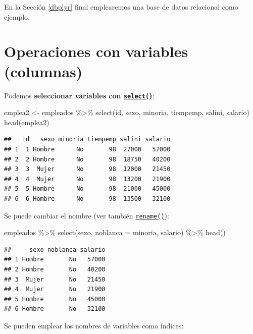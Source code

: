 \documentclass[
]{book}
\newenvironment{Shaded}{\begin{snugshade}}{\end{snugshade}}
\newcommand{\AttributeTok}[1]{\textcolor[rgb]{0.77,0.63,0.00}{#1}}
\newcommand{\FunctionTok}[1]{\textcolor[rgb]{0.00,0.00,0.00}{#1}}
\newcommand{\NormalTok}[1]{#1}
\newcommand{\OtherTok}[1]{\textcolor[rgb]{0.56,0.35,0.01}{#1}}
\newcommand{\SpecialCharTok}[1]{\textcolor[rgb]{0.00,0.00,0.00}{#1}}
\theoremstyle{break}
\theoremstyle{nonumberplain}
\begin{document}
En la Sección \ref{dbplyr} final emplearemos una base de datos relacional como ejemplo.

\hypertarget{dplyr-variables}{%
\section{Operaciones con variables (columnas)}\label{dplyr-variables}}

Podemos \textbf{seleccionar variables con \href{https://dplyr.tidyverse.org/reference/select.html}{\texttt{select()}}}:

\begin{Shaded}
\begin{Highlighting}[]
\NormalTok{emplea2 }\OtherTok{\textless{}{-}}\NormalTok{ empleados }\SpecialCharTok{\%\textgreater{}\%} \FunctionTok{select}\NormalTok{(id, sexo, minoria, tiempemp, salini, salario)}
\FunctionTok{head}\NormalTok{(emplea2)}
\end{Highlighting}
\end{Shaded}

\begin{verbatim}
##   id   sexo minoria tiempemp salini salario
## 1  1 Hombre      No       98  27000   57000
## 2  2 Hombre      No       98  18750   40200
## 3  3  Mujer      No       98  12000   21450
## 4  4  Mujer      No       98  13200   21900
## 5  5 Hombre      No       98  21000   45000
## 6  6 Hombre      No       98  13500   32100
\end{verbatim}

Se puede cambiar el nombre (ver también \href{https://dplyr.tidyverse.org/reference/rename.html}{\texttt{rename()}}):

\begin{Shaded}
\begin{Highlighting}[]
\NormalTok{empleados }\SpecialCharTok{\%\textgreater{}\%} \FunctionTok{select}\NormalTok{(sexo, }\AttributeTok{noblanca =}\NormalTok{ minoria, salario) }\SpecialCharTok{\%\textgreater{}\%} \FunctionTok{head}\NormalTok{()}
\end{Highlighting}
\end{Shaded}

\begin{verbatim}
##     sexo noblanca salario
## 1 Hombre       No   57000
## 2 Hombre       No   40200
## 3  Mujer       No   21450
## 4  Mujer       No   21900
## 5 Hombre       No   45000
## 6 Hombre       No   32100
\end{verbatim}

Se pueden emplear los nombres de variables como índices:
\end{document}
